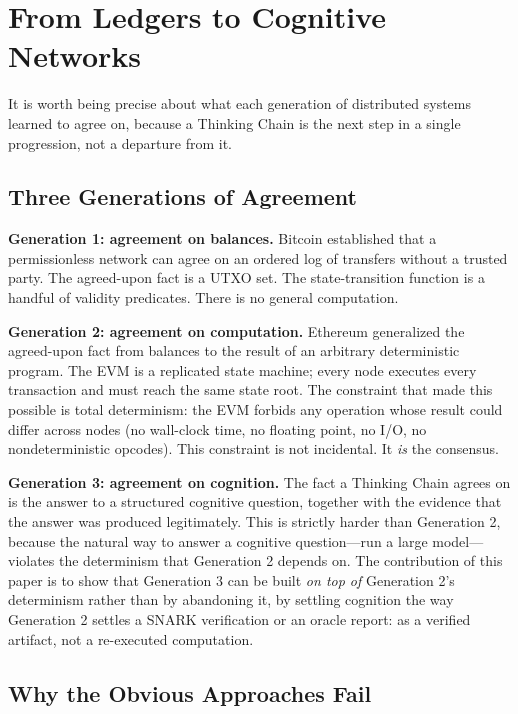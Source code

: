 \section{From Ledgers to Cognitive Networks}
\label{sec:ledgers}

It is worth being precise about what each generation of distributed systems learned to agree on, because a Thinking Chain is the next step in a single progression, not a departure from it.

\subsection{Three Generations of Agreement}

\textbf{Generation 1: agreement on balances.} Bitcoin \cite{nakamoto2008} established that a permissionless network can agree on an ordered log of transfers without a trusted party. The agreed-upon fact is a UTXO set. The state-transition function is a handful of validity predicates. There is no general computation.

\textbf{Generation 2: agreement on computation.} Ethereum \cite{wood2014} generalized the agreed-upon fact from balances to the result of an arbitrary deterministic program. The EVM is a replicated state machine; every node executes every transaction and must reach the same state root. The constraint that made this possible is total determinism: the EVM forbids any operation whose result could differ across nodes (no wall-clock time, no floating point, no I/O, no nondeterministic opcodes). This constraint is not incidental. It \emph{is} the consensus.

\textbf{Generation 3: agreement on cognition.} The fact a Thinking Chain agrees on is the answer to a structured cognitive question, together with the evidence that the answer was produced legitimately. This is strictly harder than Generation 2, because the natural way to answer a cognitive question---run a large model---violates the determinism that Generation 2 depends on. The contribution of this paper is to show that Generation 3 can be built \emph{on top of} Generation 2's determinism rather than by abandoning it, by settling cognition the way Generation 2 settles a SNARK verification or an oracle report: as a verified artifact, not a re-executed computation.

\subsection{Why the Obvious Approaches Fail}

